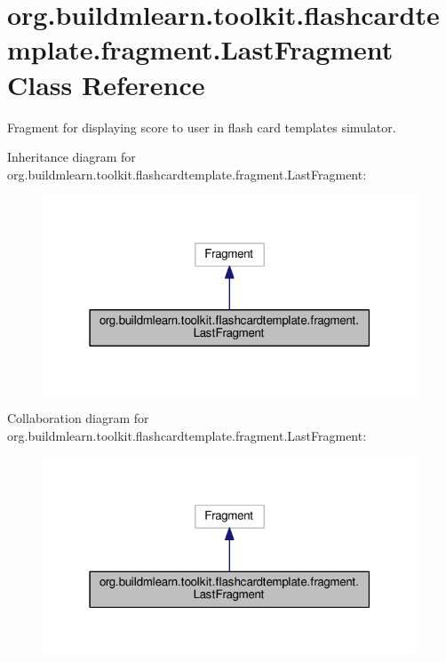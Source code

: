 \hypertarget{classorg_1_1buildmlearn_1_1toolkit_1_1flashcardtemplate_1_1fragment_1_1LastFragment}{}\section{org.\+buildmlearn.\+toolkit.\+flashcardtemplate.\+fragment.\+Last\+Fragment Class Reference}
\label{classorg_1_1buildmlearn_1_1toolkit_1_1flashcardtemplate_1_1fragment_1_1LastFragment}


Fragment for displaying score to user in flash card template\textquotesingle{}s simulator.  




Inheritance diagram for org.\+buildmlearn.\+toolkit.\+flashcardtemplate.\+fragment.\+Last\+Fragment\+:
\nopagebreak
\begin{figure}[H]
\begin{center}
\leavevmode
\includegraphics[width=316pt]{classorg_1_1buildmlearn_1_1toolkit_1_1flashcardtemplate_1_1fragment_1_1LastFragment__inherit__graph}
\end{center}
\end{figure}


Collaboration diagram for org.\+buildmlearn.\+toolkit.\+flashcardtemplate.\+fragment.\+Last\+Fragment\+:
\nopagebreak
\begin{figure}[H]
\begin{center}
\leavevmode
\includegraphics[width=316pt]{classorg_1_1buildmlearn_1_1toolkit_1_1flashcardtemplate_1_1fragment_1_1LastFragment__coll__graph}
\end{center}
\end{figure}
